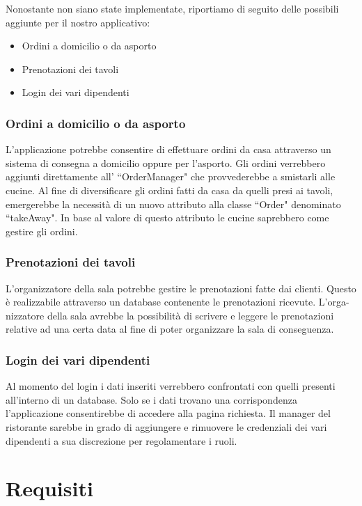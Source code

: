 \documentclass{article}
\begin{document}
Nonostante non siano state implementate, riportiamo di seguito delle possibili aggiunte per il nostro applicativo:

\begin{itemize}
\item Ordini a domicilio o da asporto
\item Prenotazioni dei tavoli
\item Login dei vari dipendenti
\end{itemize}

\subsubsection{Ordini a domicilio o da asporto}
L'applicazione potrebbe consentire di effettuare ordini da casa attraverso un sistema di consegna a domicilio oppure per l'asporto. Gli ordini verrebbero aggiunti direttamente all' ``OrderManager" che provvederebbe a smistarli alle cucine. Al fine di diversificare gli ordini fatti da casa da quelli presi ai tavoli, emergerebbe la necessit\`a di un nuovo attributo alla classe ``Order" denominato ``takeAway". In base al valore di questo attributo le cucine saprebbero come gestire gli ordini.  

\subsubsection{Prenotazioni dei tavoli}  
L'organizzatore della sala potrebbe gestire le prenotazioni fatte dai clienti. Questo \`e realizzabile attraverso un database contenente le prenotazioni ricevute. L'orga-\\nizzatore della sala avrebbe la possibilit\`a di scrivere e leggere le prenotazioni relative ad una certa data al fine di poter organizzare la sala di conseguenza.

\subsubsection{Login dei vari dipendenti}
Al momento del login i dati inseriti verrebbero confrontati con quelli presenti all'interno di un database. Solo se i dati trovano una corrispondenza l'applicazione consentirebbe di accedere alla pagina richiesta. Il manager del ristorante sarebbe in grado di aggiungere e rimuovere le credenziali dei vari dipendenti a sua discrezione per regolamentare i ruoli.

\newpage

\section{Requisiti}
\end{document}
